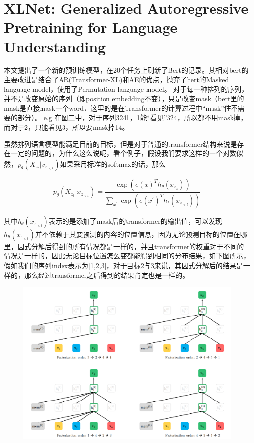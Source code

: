 \documentclass[a4paper,UTF8]{article}
\numberwithin{equation}{section}
\begin{document}
\newpage
\section{XLNet: Generalized Autoregressive Pretraining for Language Understanding}
本文提出了一个新的预训练模型，在20个任务上刷新了Bert的记录。其相对bert的主要改进是结合了AR(Transformer-XL)和AE的优点，抛弃了bert的Masked language model，使用了Permutation language model。
对于每一种排列的序列，并不是改变原始的序列（即position embedding不变），只是改变mask（bert里的mask是直接mask一个word，这里的是在Transformer的计算过程中“mask”住不需要的部分）。
e.g 在图二中，对于序列3241，1能“看见”324，所以都不用mask掉，而对于2，只能看见3，所以要mask掉14。

虽然排列语言模型能满足目前的目标，但是对于普通的transformer结构来说是存在一定的问题的，为什么这么说呢，看个例子，假设我们要求这样的一个对数似然，$p_{\theta}\left(X_{z_{t}} | x_{z_{<t}}\right)$如果采用标准的softmax的话，那么

$$
p_{\theta}\left(X_{z_{t}} | x_{z_{<t}}\right)=\frac{\exp \left(e(x)^{T} h_{\theta}\left(x_{z_{z}}\right)\right)}{\sum_{x^{\prime}} \exp \left(e\left(x^{\prime}\right)^{T} h_{\theta}\left(x_{z_{<t}}\right)\right)}
$$

其中$h_{\theta}\left(x_{z_{<t}}\right)$表示的是添加了mask后的transformer的输出值，可以发现$h_{\theta}\left(x_{z_{<t}}\right)$并不依赖于其要预测的内容的位置信息，因为无论预测目标的位置在哪里，因式分解后得到的所有情况都是一样的，并且transformer的权重对于不同的情况是一样的，因此无论目标位置怎么变都能得到相同的分布结果，如下图所示，假如我们的序列index表示为[1,2,3]，对于目标2与3来说，其因式分解后的结果是一样的，那么经过transformer之后得到的结果肯定也是一样的。
\begin{figure}[H]
	\centering
	\includegraphics[width=\textwidth]{5-1.png}
\end{figure}
\end{document}
